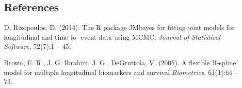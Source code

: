 \documentclass[12pt]{article}
\begin{document}
%        
%
%        

\subsection*{References}

\begin{description}

\item
D. Rizopoulos, D. (2014).  The R package JMbayes for fitting joint models for longitudinal and time-to- 
event data using MCMC.
\textit{Journal of Statistical Software,} 72(7):1 -- 45.

\item
Brown, E. R., J. G. Ibrahim, J. G., DeGruttola, V. (2005). A flexible B-spline model for multiple 
longitudinal biomarkers and survival.\textit{Biometrics,} 61(1):64 -- 73.


\end{description}
\end{document}
